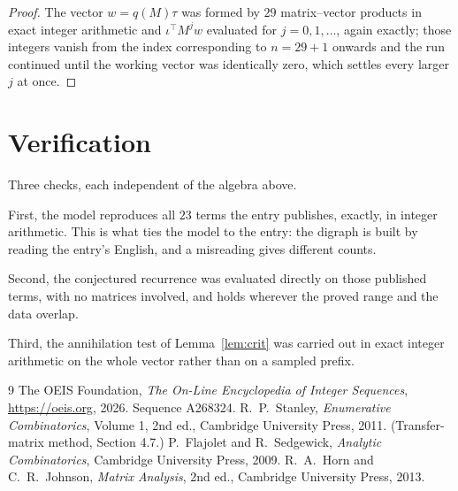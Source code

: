 \documentclass[11pt,a4paper]{article}
\theoremstyle{plain}
\theoremstyle{definition}
\begin{document}
\begin{proof}
The vector $w=q(M)\tau$ was formed by $29$ matrix--vector products in exact integer
arithmetic and $\iota^{\!\top}M^{j}w$ evaluated for $j=0,1,\dots$, again exactly; those
integers vanish from the index corresponding to $n=29+1$ onwards and the run continued
until the working vector was identically zero, which settles every larger $j$ at once.
\end{proof}

\section{Verification}

Three checks, each independent of the algebra above.

First, the model reproduces all $23$ terms the entry publishes, exactly, in integer
arithmetic. This is what ties the model to the entry: the digraph is built by reading the
entry's English, and a misreading gives different counts.

Second, the conjectured recurrence was evaluated directly on those published terms, with no
matrices involved, and holds wherever the proved range and the data overlap.

Third, the annihilation test of Lemma~\ref{lem:crit} was carried out in exact integer
arithmetic on the whole vector rather than on a sampled prefix.

\begin{thebibliography}{9}
 The OEIS Foundation, \emph{The On-Line Encyclopedia of Integer
Sequences}, \url{https://oeis.org}, 2026. Sequence A268324.
 R.~P.~Stanley, \emph{Enumerative Combinatorics}, Volume 1, 2nd ed.,
Cambridge University Press, 2011. (Transfer-matrix method, Section 4.7.)
 P.~Flajolet and R.~Sedgewick, \emph{Analytic Combinatorics}, Cambridge
University Press, 2009.
 R.~A.~Horn and C.~R.~Johnson, \emph{Matrix Analysis}, 2nd ed., Cambridge
University Press, 2013.
\end{thebibliography}
\end{document}
